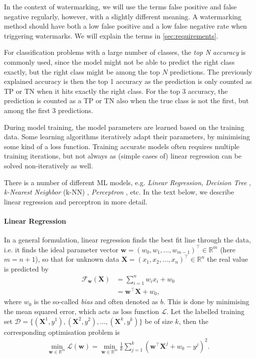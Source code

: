 In the context of watermarking, we will use the terms false positive and false negative regularly, however, with a slightly different meaning. A watermarking method should have both a low false positive and a low false negative rate when triggering watermarks. We will explain the terms in \cref{sec:requirements}.

For classification problems with a large number of classes, the \textit{top N accuracy} is commonly used, since the model might not be able to predict the right class exactly, but the right class might be among the top $N$ predictions. The previously explained accuracy is then the top 1 accuracy as the prediction is only counted as TP or TN when it hits exactly the right class. For the top 3 accuracy, the prediction is counted as a TP or TN also when the true class is not the first, but among the first 3 predictions.

During model training, the model parameters are learned based on the training data. Some learning algorithms iteratively adapt their parameters, by minimising some kind of a loss function. Training accurate models often requires multiple training iterations, but not always as (simple cases of) linear regression can be solved non-iteratively as well.

There is a number of different ML models, e.g. \textit{Linear Regression}, \textit{Decision Tree} \cite{breiman_classification_2017}, \textit{k-Nearest Neighbor} (k-NN) \cite{altman_introduction_1992}, \textit{Perceptron} \cite{freund_large_1999}, etc. In the text below, we describe linear regression and perceptron in more detail.

\paragraph{Linear Regression} In a general formulation, linear regression finds the best fit line through the data, i.e. it finds the ideal parameter vector $\mathbf{w}=(w_0, w_1, \dots, w_{m-1})^\top \in \mathbb{R}^{m}$ (here $m=n+1$), so that for unknown data $\mathbf{X}=(x_1, x_2, \dots, x_n)^\top \in \mathbb{R}^n$ the real value is predicted by
\begin{align}
    \mathcal{F}_{\mathbf{w}}(\mathbf{X}) &= \sum_{i=1}^{n} w_i x_i + w_0 \\
    &= \mathbf{w}^\top \mathbf{X} + w_0,
\end{align}
where $w_0$ is the so-called \textit{bias} and often denoted as $b$.
This is done by minimising the mean squared error, which acts as loss function $\mathcal{L}$. Let the labelled training set $\mathcal{D} = \{(\mathbf{X}^1, y^1), (\mathbf{X}^2, y^2), \dots, (\mathbf{X}^k, y^k)\}$ be of size $k$, then the corresponding optimisation problem is
\begin{align} \label{eq:regression_loss}
    \min_{\mathbf{w} \in \mathbb{R}^m} \mathcal{L}(\mathbf{w}) = \min_{\mathbf{w} \in \mathbb{R}^m} \frac{1}{k} \sum_{j=1}^k \left(\mathbf{w}^\top \mathbf{X}^j + w_0 - y^j \right)^2.
\end{align}

